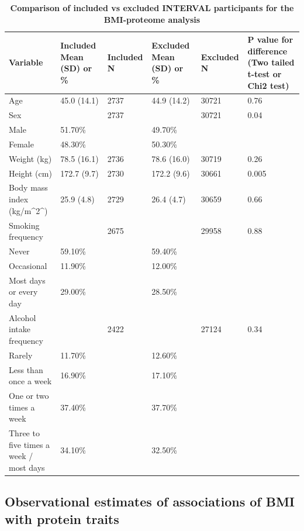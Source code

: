 \documentclass[11pt,twoside]{bristolthesis}
\begin{document}
\begin{landscape}\begin{table}

\caption[Comparison of included vs excluded INTERVAL participants for the BMI-proteome analysis]{\label{tab:Inc-excl-part}\textbf{Comparison of included vs excluded INTERVAL participants for the BMI-proteome analysis}}
\centering
\begin{tabu} to 
\toprule
Variable & Included Mean (SD) or \% & Included N & Excluded Mean (SD) or \% & Excluded N & P value for difference (Two tailed t-test or Chi2 test)\\
\midrule
Age & 45.0 (14.1) & 2737 & 44.9 (14.2) & 30721 & 0.76\\
Sex &  & 2737 &  & 30721 & 0.04\\
\hspace{1em}Male & 51.70\% &  & 49.70\% &  & \\
\hspace{1em}Female & 48.30\% &  & 50.30\% &  & \\
Weight (kg) & 78.5 (16.1) & 2736 & 78.6 (16.0) & 30719 & 0.26\\
\addlinespace
Height (cm) & 172.7 (9.7) & 2730 & 172.2 (9.6) & 30661 & 0.005\\
Body mass index (kg/m\textasciicircum{}2\textasciicircum{}) & 25.9 (4.8) & 2729 & 26.4 (4.7) & 30659 & 0.66\\
Smoking frequency &  & 2675 &  & 29958 & 0.88\\
\hspace{1em}Never & 59.10\% &  & 59.40\% &  & \\
\hspace{1em}Occasional & 11.90\% &  & 12.00\% &  & \\
\addlinespace
\hspace{1em}Most days or every day & 29.00\% &  & 28.50\% &  & \\
Alcohol intake frequency &  & 2422 &  & 27124 & 0.34\\
\hspace{1em}Rarely & 11.70\% &  & 12.60\% &  & \\
\hspace{1em}Less than once a week & 16.90\% &  & 17.10\% &  & \\
\hspace{1em}One or two times a week & 37.40\% &  & 37.70\% &  & \\
\addlinespace
\hspace{1em}Three to five times a week / most days & 34.10\% &  & 32.50\% &  & \\
\bottomrule
\end{tabu}
\end{table}
\end{landscape}
\hypertarget{observational-estimates-of-associations-of-bmi-with-protein-traits}{%
\subsection{Observational estimates of associations of BMI with protein traits}\label{observational-estimates-of-associations-of-bmi-with-protein-traits}}
\end{document}
